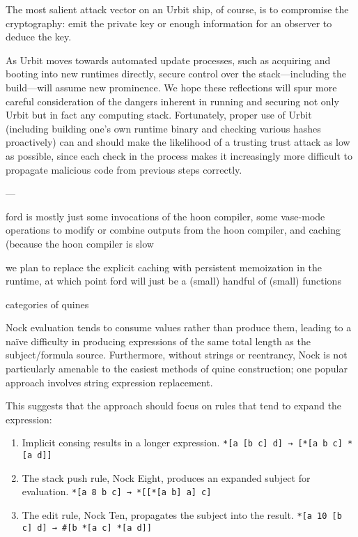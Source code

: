 \documentclass[twoside]{article}
\begin{document}
The most salient attack vector on an Urbit ship, of course, is to compromise the cryptography:  emit the private key or enough information for an observer to deduce the key.


As Urbit moves towards automated update processes, such as acquiring and booting into new runtimes directly, secure control over the stack—including the build—will assume new prominence.  We hope these reflections will spur more careful consideration of the dangers inherent in running and securing not only Urbit but in fact any computing stack.  Fortunately, proper use of Urbit (including building one's own runtime binary and checking various hashes proactively) can and should make the likelihood of a trusting trust attack as low as possible, since each check in the process makes it increasingly more difficult to propagate malicious code from previous steps correctly.\tombstone{}

---

ford is mostly just some invocations of the hoon compiler, some vase-mode operations to modify or combine outputs from the hoon compiler, and caching (because the hoon compiler is slow

we plan to replace the explicit caching with persistent memoization in the runtime, at which point ford will just be a (small) handful of (small) functions


categories of quines

Nock evaluation tends to consume values rather than produce them, leading to a naïve difficulty in producing expressions of the same total length as the subject/formula source.  Furthermore, without strings or reentrancy, Nock is not particularly amenable to the easiest methods of quine construction; one popular approach involves string expression replacement.

This suggests that the approach should focus on rules that tend to expand the expression:

\begin{enumerate}
  \item  Implicit consing results in a longer expression.  \texttt{*[a [b c] d] → [*[a b c] *[a d]]}
  \item  The stack push rule, Nock Eight, produces an expanded subject for evaluation.  \texttt{*[a 8 b c] → *[[*[a b] a] c]}
  \item  The edit rule, Nock Ten, propagates the subject into the result.  \texttt{*[a 10 [b c] d] → #[b *[a c] *[a d]]}
\end{enumerate}
\end{document}
